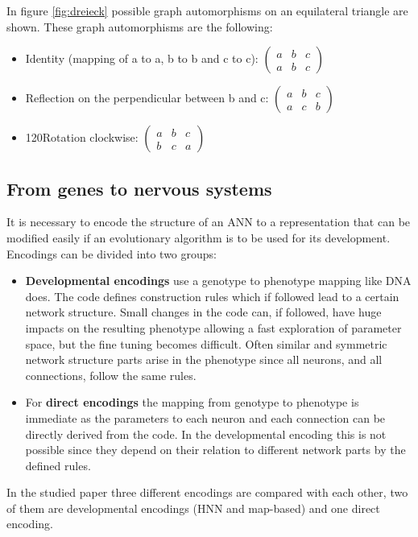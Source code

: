 \documentclass[12pt,twoside]{article}
\theoremstyle{plain}
\theoremstyle{definition}
\theoremstyle{remark}
\begin{document}
In figure \ref{fig:dreieck} possible graph automorphisms on an equilateral triangle are shown. These graph automorphisms are the following:
\begin{itemize}
	\item Identity (mapping of a to a, b to b and c to c):
	$
	\begin{pmatrix}
	a & b & c \\
	a & b & c
	\end{pmatrix}
	$
	\item Reflection on the perpendicular between b and c:
	$
	\begin{pmatrix}
	a & b & c \\
	a & c & b
	\end{pmatrix}
	$
	\item 120\degree Rotation clockwise:
	$
	\begin{pmatrix}
	a & b & c \\
	b & c & a
	\end{pmatrix}
	$
\end{itemize} 

\subsection{From genes to nervous systems}
\label{genes_nervous}
It is necessary to encode the structure of an ANN to a representation that can be modified easily if an evolutionary algorithm is to be used for its development.
Encodings can be divided into two groups:
\begin{itemize}
	\item \textbf{Developmental encodings} use a genotype to phenotype mapping like DNA does. The code defines construction rules which if followed lead to a certain network structure. Small changes in the code can, if followed, have huge impacts on the resulting phenotype allowing a fast exploration of parameter space, but the fine tuning becomes difficult.
	Often similar and symmetric network structure parts arise in the phenotype since all neurons, and all connections, follow the same rules.
	\item For \textbf{direct encodings} the mapping from genotype to phenotype is immediate as the parameters to each neuron and each connection can be directly derived from the code. In the developmental encoding this is not possible since they depend on their relation to different network parts by the defined rules.
\end{itemize}
In the studied paper three different encodings are compared with each other, two of them are developmental encodings (HNN and map-based) and one direct encoding.
\end{document}

